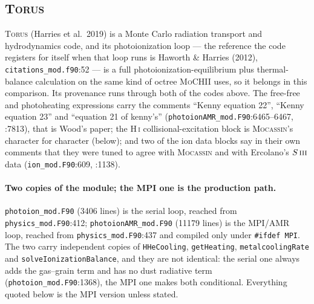\documentclass[english,a4paper]{my_memo}
\newcommand{\code}[1]{\texttt{#1}}
\newcommand{\MoCHII}{\textsc{MoCHII}}
\newcommand{\Mocassin}{\textsc{Mocassin}}
\newcommand{\Torus}{\textsc{Torus}}
\newcommand{\HI}{H\,\textsc{i}}
\newcommand{\SIII}{S\,\textsc{iii}}
\begin{document}
\subsection{\Torus{}}

\Torus{} (Harries et al.\ 2019) is a Monte Carlo radiation transport and
hydrodynamics code, and its photoionization loop --- the reference the code
registers for itself when that loop runs is Haworth \& Harries (2012),
\code{citations\_mod.f90}:52 --- is a full photoionization-equilibrium plus
thermal-balance calculation on the same kind of octree \MoCHII{} uses, so it
belongs in this comparison.  Its provenance runs through both of the codes
above.  The free-free and photoheating expressions carry the comments ``Kenny
equation 22'', ``Kenny equation 23'' and ``equation 21 of kenny's''
(\code{photoionAMR\_mod.F90}:6465--6467, :7813), that is Wood's paper; the
\HI{} collisional-excitation block is \Mocassin{}'s character for character
(below); and two of the ion data blocks say in their own comments that they
were tuned to agree with \Mocassin{} and with Ercolano's $\SIII{}$ data
(\code{ion\_mod.F90}:609, :1138).

\paragraph{Two copies of the module; the MPI one is the production path.}
\code{photoion\_mod.F90} (3406 lines) is the serial loop, reached from
\code{physics\_mod.F90}:412; \code{photoionAMR\_mod.F90} (11179 lines) is the
MPI/AMR loop, reached from \code{physics\_mod.F90}:437 and compiled only under
\code{\#ifdef MPI}.  The two carry independent copies of \code{HHeCooling},
\code{getHeating}, \code{metalcoolingRate} and \code{solveIonizationBalance},
and they are not identical: the serial one always adds the gas--grain term and
has no dust radiative term (\code{photoion\_mod.F90}:1368), the MPI one makes
both conditional.  Everything quoted below is the MPI version unless stated.
\end{document}
